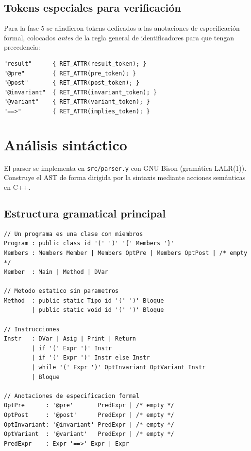 \subsection{Tokens especiales para verificaci\'on}

Para la fase 5 se a\~nadieron tokens dedicados a las anotaciones de
especificaci\'on formal, colocados \emph{antes} de la regla general de
identificadores para que tengan precedencia:

\begin{lstlisting}[style=cpp, caption={Reglas l\'exicas para anotaciones formales}]
"result"      { RET_ATTR(result_token); }
"@pre"        { RET_ATTR(pre_token); }
"@post"       { RET_ATTR(post_token); }
"@invariant"  { RET_ATTR(invariant_token); }
"@variant"    { RET_ATTR(variant_token); }
"==>"         { RET_ATTR(implies_token); }
\end{lstlisting}

\section{An\'alisis sint\'actico}

El parser se implementa en \texttt{src/parser.y} con GNU Bison (gram\'atica
LALR(1)). Construye el AST de forma dirigida por la sintaxis mediante
acciones sem\'anticas en C++.

\subsection{Estructura gramatical principal}

\begin{lstlisting}[style=pseudo, caption={Reglas principales de la gram\'atica Bison}]
// Un programa es una clase con miembros
Program : public class id '(' ')' '{' Members '}'
Members : Members Member | Members OptPre | Members OptPost | /* empty */
Member  : Main | Method | DVar

// Metodo estatico sin parametros
Method  : public static Tipo id '(' ')' Bloque
        | public static void id '(' ')' Bloque

// Instrucciones
Instr   : DVar | Asig | Print | Return
        | if '(' Expr ')' Instr
        | if '(' Expr ')' Instr else Instr
        | while '(' Expr ')' OptInvariant OptVariant Instr
        | Bloque

// Anotaciones de especificacion formal
OptPre      : '@pre'       PredExpr | /* empty */
OptPost     : '@post'      PredExpr | /* empty */
OptInvariant: '@invariant' PredExpr | /* empty */
OptVariant  : '@variant'   PredExpr | /* empty */
PredExpr    : Expr '==>' Expr | Expr
\end{lstlisting}


